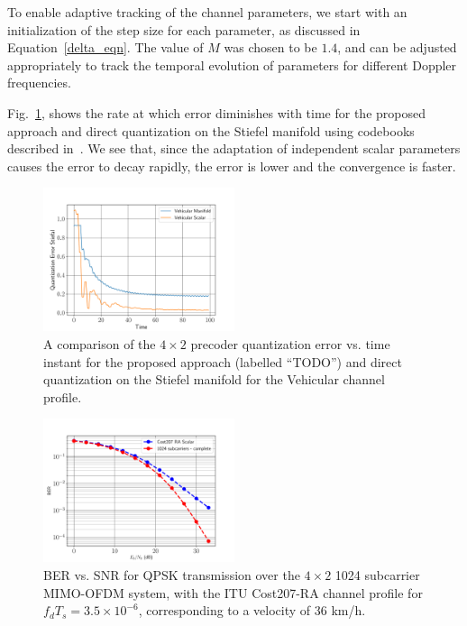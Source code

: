 \documentclass[journal,10pt,twocolumn]{IEEEtran}
\begin{document}
To enable adaptive tracking of the channel parameters, we start with
an initialization of the step size for each parameter, as discussed in
Equation~\ref{delta_eqn}. The value of $M$ was chosen to be $1.4$, and
can be adjusted appropriately to track the temporal evolution of
parameters for different Doppler frequencies.

Fig.~\ref{fig:error_decay}, shows the rate at which error diminishes
with time for the proposed approach and direct quantization on the
Stiefel manifold using codebooks described
in~\cite{Gupt1905:Predictive}. We see that, since the adaptation of
independent scalar parameters causes the error to decay rapidly, the
error is lower and the convergence is faster.
\begin{figure}
\includegraphics[width=0.5\textwidth]{images/stief_veh.pdf}
\caption{\label{fig:error_decay}A comparison of the $4\times 2$ precoder quantization error vs. time instant for
  the proposed approach (labelled ``TODO'') and direct quantization on
the Stiefel manifold for the Vehicular channel profile.}
\end{figure}

\begin{figure}
\includegraphics[width=0.5\textwidth]{images/cost0035}
\caption{BER vs. SNR for QPSK transmission over the $4\times 2$ 1024
  subcarrier MIMO-OFDM system, with the ITU Cost207-RA channel profile
  for $f_dT_s = 3.5\times 10^{-6}$, corresponding to a velocity of 36 km/h.}
\label{fig:ber_ped}
\end{figure}
\end{document}
